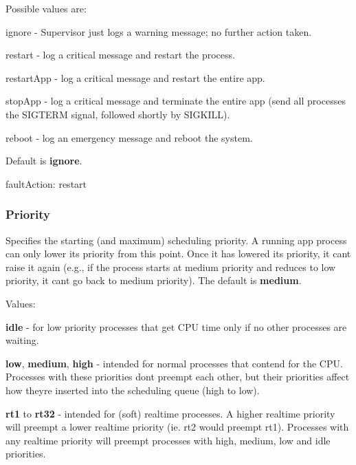 Possible values are\+:


\begin{DoxyItemize}
\item {\ttfamily ignore} -\/ Supervisor just logs a warning message; no further action taken.
\item {\ttfamily restart} -\/ log a critical message and restart the process.
\item {\ttfamily restart\+App} -\/ log a critical message and restart the entire app.
\item {\ttfamily stop\+App} -\/ log a critical message and terminate the entire app (send all processes the S\+I\+G\+T\+E\+R\+M signal, followed shortly by S\+I\+G\+K\+I\+L\+L).
\item {\ttfamily reboot} -\/ log an emergency message and reboot the system.
\end{DoxyItemize}

Default is {\bfseries ignore}.


\begin{DoxyCode}
faultAction: restart
\end{DoxyCode}
\hypertarget{def_files_adef_defFilesAdef_processPriority}{}\subsubsection{Priority}\label{def_files_adef_defFilesAdef_processPriority}
Specifies the starting (and maximum) scheduling priority. A running app process can only lower its priority from this point. Once it has lowered its priority, it can\textquotesingle{}t raise it again (e.\+g., if the process starts at medium priority and reduces to low priority, it can\textquotesingle{}t go back to medium priority). The default is {\bfseries medium}.

Values\+:
\begin{DoxyItemize}
\item {\bfseries idle} -\/ for low priority processes that get C\+P\+U time only if no other processes are waiting.
\item {\bfseries low}, {\bfseries medium}, {\bfseries high} -\/ intended for normal processes that contend for the C\+P\+U. Processes with these priorities don\textquotesingle{}t preempt each other, but their priorities affect how they\textquotesingle{}re inserted into the scheduling queue (high to low).
\item {\bfseries rt1} to {\bfseries rt32} -\/ intended for (soft) realtime processes. A higher realtime priority will preempt a lower realtime priority (ie. rt2 would preempt rt1). Processes with any realtime priority will preempt processes with high, medium, low and idle priorities.
\end{DoxyItemize}

